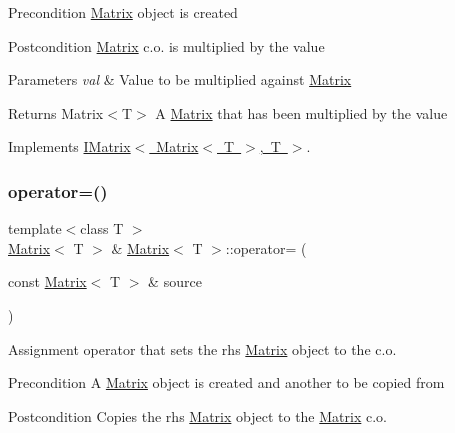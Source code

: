 \begin{DoxyPrecond}{Precondition}
\mbox{\hyperlink{class_matrix}{Matrix}} object is created 
\end{DoxyPrecond}
\begin{DoxyPostcond}{Postcondition}
\mbox{\hyperlink{class_matrix}{Matrix}} c.\+o. is multiplied by the value 
\end{DoxyPostcond}

\begin{DoxyParams}{Parameters}
{\em val} & Value to be multiplied against \mbox{\hyperlink{class_matrix}{Matrix}} \\
\hline
\end{DoxyParams}
\begin{DoxyReturn}{Returns}
Matrix$<$\+T$>$ A \mbox{\hyperlink{class_matrix}{Matrix}} that has been multiplied by the value 
\end{DoxyReturn}


Implements \mbox{\hyperlink{class_i_matrix_a10121e038635bdf33552c6a1fb288398}{I\+Matrix$<$ Matrix$<$ T $>$, T $>$}}.

\mbox{\label{class_matrix_a33c00fb6f2e9401d17d9ed615b965634}} 
\subsubsection{\texorpdfstring{operator=()}{operator=()}}
{\footnotesize\ttfamily template$<$class T $>$ \\
\mbox{\hyperlink{class_matrix}{Matrix}}$<$ T $>$ \& \mbox{\hyperlink{class_matrix}{Matrix}}$<$ T $>$\+::operator= (\begin{DoxyParamCaption}\item[{const \mbox{\hyperlink{class_matrix}{Matrix}}$<$ T $>$ \&}]{source }\end{DoxyParamCaption})\hspace{0.3cm}{\ttfamily [virtual]}}



Assignment operator that sets the rhs \mbox{\hyperlink{class_matrix}{Matrix}} object to the c.\+o. 

\begin{DoxyPrecond}{Precondition}
A \mbox{\hyperlink{class_matrix}{Matrix}} object is created and another to be copied from 
\end{DoxyPrecond}
\begin{DoxyPostcond}{Postcondition}
Copies the rhs \mbox{\hyperlink{class_matrix}{Matrix}} object to the \mbox{\hyperlink{class_matrix}{Matrix}} c.\+o. 
\end{DoxyPostcond}

